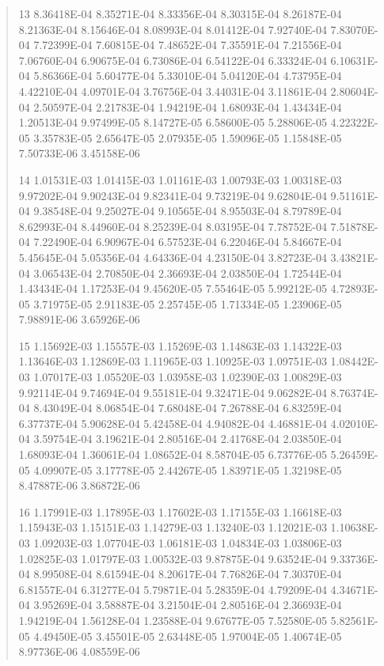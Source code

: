\documentclass[letterpaper,10pt,english]{sphinxmanual}
\begin{document}
\begin{quote}
\begin{DUlineblock}{0em}
\item[] 13   8.36418E-04  8.35271E-04  8.33356E-04  8.30315E-04  8.26187E-04  8.21363E-04  8.15646E-04  8.08993E-04  8.01412E-04  7.92740E-04  7.83070E-04  7.72399E-04  7.60815E-04  7.48652E-04  7.35591E-04  7.21556E-04  7.06760E-04  6.90675E-04  6.73086E-04  6.54122E-04  6.33324E-04  6.10631E-04  5.86366E-04  5.60477E-04  5.33010E-04  5.04120E-04  4.73795E-04  4.42210E-04  4.09701E-04  3.76756E-04  3.44031E-04  3.11861E-04  2.80604E-04  2.50597E-04  2.21783E-04  1.94219E-04  1.68093E-04  1.43434E-04  1.20513E-04  9.97499E-05  8.14727E-05  6.58600E-05  5.28806E-05  4.22322E-05  3.35783E-05  2.65647E-05  2.07935E-05  1.59096E-05  1.15848E-05  7.50733E-06  3.45158E-06
\item[] 14   1.01531E-03  1.01415E-03  1.01161E-03  1.00793E-03  1.00318E-03  9.97202E-04  9.90243E-04  9.82341E-04  9.73219E-04  9.62804E-04  9.51161E-04  9.38548E-04  9.25027E-04  9.10565E-04  8.95503E-04  8.79789E-04  8.62993E-04  8.44960E-04  8.25239E-04  8.03195E-04  7.78752E-04  7.51878E-04  7.22490E-04  6.90967E-04  6.57523E-04  6.22046E-04  5.84667E-04  5.45645E-04  5.05356E-04  4.64336E-04  4.23150E-04  3.82723E-04  3.43821E-04  3.06543E-04  2.70850E-04  2.36693E-04  2.03850E-04  1.72544E-04  1.43434E-04  1.17253E-04  9.45620E-05  7.55464E-05  5.99212E-05  4.72893E-05  3.71975E-05  2.91183E-05  2.25745E-05  1.71334E-05  1.23906E-05  7.98891E-06  3.65926E-06
\item[] 15   1.15692E-03  1.15557E-03  1.15269E-03  1.14863E-03  1.14322E-03  1.13646E-03  1.12869E-03  1.11965E-03  1.10925E-03  1.09751E-03  1.08442E-03  1.07017E-03  1.05520E-03  1.03958E-03  1.02390E-03  1.00829E-03  9.92114E-04  9.74694E-04  9.55181E-04  9.32471E-04  9.06282E-04  8.76374E-04  8.43049E-04  8.06854E-04  7.68048E-04  7.26788E-04  6.83259E-04  6.37737E-04  5.90628E-04  5.42458E-04  4.94082E-04  4.46881E-04  4.02010E-04  3.59754E-04  3.19621E-04  2.80516E-04  2.41768E-04  2.03850E-04  1.68093E-04  1.36061E-04  1.08652E-04  8.58704E-05  6.73776E-05  5.26459E-05  4.09907E-05  3.17778E-05  2.44267E-05  1.83971E-05  1.32198E-05  8.47887E-06  3.86872E-06
\item[] 16   1.17991E-03  1.17895E-03  1.17602E-03  1.17155E-03  1.16618E-03  1.15943E-03  1.15151E-03  1.14279E-03  1.13240E-03  1.12021E-03  1.10638E-03  1.09203E-03  1.07704E-03  1.06181E-03  1.04834E-03  1.03806E-03  1.02825E-03  1.01797E-03  1.00532E-03  9.87875E-04  9.63524E-04  9.33736E-04  8.99508E-04  8.61594E-04  8.20617E-04  7.76826E-04  7.30370E-04  6.81557E-04  6.31277E-04  5.79871E-04  5.28359E-04  4.79209E-04  4.34671E-04  3.95269E-04  3.58887E-04  3.21504E-04  2.80516E-04  2.36693E-04  1.94219E-04  1.56128E-04  1.23588E-04  9.67677E-05  7.52580E-05  5.82561E-05  4.49450E-05  3.45501E-05  2.63448E-05  1.97004E-05  1.40674E-05  8.97736E-06  4.08559E-06

\end{DUlineblock}
\end{quote}
\end{document}
